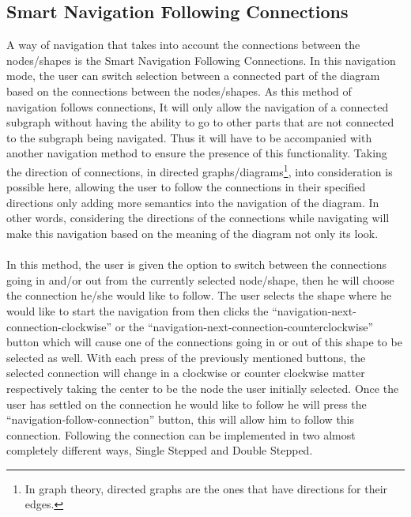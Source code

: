 \subsection{Smart Navigation Following Connections}
A way of navigation that takes into account the connections between the nodes/shapes is the Smart Navigation Following Connections. %
In this navigation mode, the user can switch selection between a connected part of the diagram based on the connections between the nodes/shapes. As this method of navigation follows connections, It will only allow the navigation of a connected subgraph without having the ability to go to other parts that are not connected to the subgraph being navigated. Thus it will have to be accompanied with another navigation method to ensure the presence of this functionality. Taking the direction of connections, in directed graphs/diagrams\footnote{In graph theory, directed graphs are the ones that have directions for their edges.}, into consideration is possible here, allowing the user to follow the connections in their specified directions only adding more semantics into the navigation of the diagram. In other words, considering the directions of the connections while navigating will make this navigation based on the meaning of the diagram not only its look.

\paragraph{}
In this method, the user is given the option to switch between the connections going in and/or out from the currently selected node/shape, then he will choose the connection he/she would like to follow. The user selects the shape where he would like to start the navigation from then clicks the ``navigation-next-connection-clockwise'' or the ``navigation-next-connection-counterclockwise'' button which will cause one of the connections going in or out of this shape to be selected as well. With each press of the previously mentioned buttons, the selected connection will change in a clockwise or counter clockwise matter respectively taking the center to be the node the user initially selected. Once the user has settled on the connection he would like to follow he will press the ``navigation-follow-connection'' button, this will allow him to follow this connection. Following the connection can be implemented in two almost completely different ways, Single Stepped and Double Stepped.


